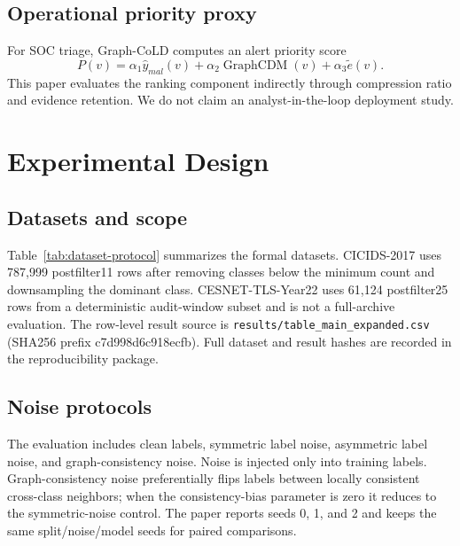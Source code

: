 \documentclass[preprint,review,12pt]{elsarticle}
\begin{document}
\subsection{Operational priority proxy}
For SOC triage, Graph-CoLD computes an alert priority score
\begin{equation}
P(v)=\alpha_1\hat y_{mal}(v)+\alpha_2\operatorname{GraphCDM}(v)+\alpha_3\tilde e(v).
\end{equation}
This paper evaluates the ranking component indirectly through compression ratio
and evidence retention. We do not claim an analyst-in-the-loop deployment study.

\section{Experimental Design}
\subsection{Datasets and scope}
Table~\ref{tab:dataset-protocol} summarizes the formal datasets. CICIDS-2017
uses 787,999 postfilter11 rows
after removing classes below the minimum count and downsampling the dominant
class. CESNET-TLS-Year22 uses 61,124
postfilter25 rows from a deterministic audit-window subset and is not a full-archive evaluation. The row-level result
source is \texttt{results/table\_main\_expanded.csv} (SHA256 prefix
c7d998d6c918ecfb). Full dataset and result hashes are recorded in the
reproducibility package.

\begin{table}[t]
\centering
\caption{Verified real-data protocols. CESNET-TLS-Year22 is an audit-window subset and not a full-archive evaluation.}
\label{tab:dataset-protocol}
\resizebox{\textwidth}{!}{}
\end{table}

\subsection{Noise protocols}
The evaluation includes clean labels, symmetric label noise, asymmetric label
noise, and graph-consistency noise. Noise is injected only into training labels.
Graph-consistency noise preferentially flips labels between locally consistent
cross-class neighbors; when the consistency-bias parameter is zero it reduces to
the symmetric-noise control. The paper reports seeds 0, 1, and 2 and keeps the
same split/noise/model seeds for paired comparisons.
\end{document}
